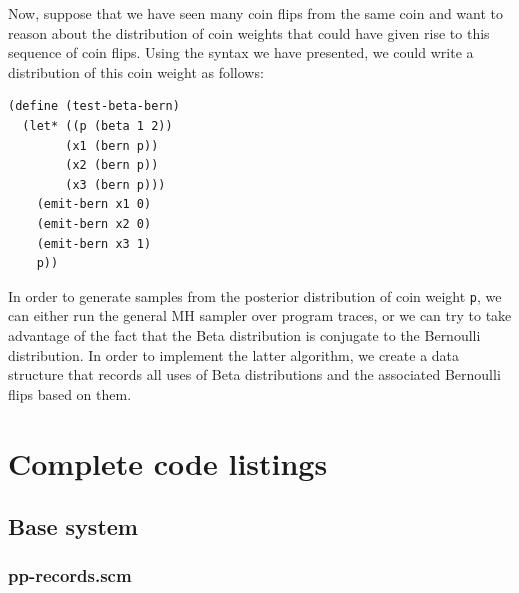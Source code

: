 \documentclass{article}
\begin{document}
Now, suppose that we have seen many coin flips from the same coin and want to
reason about the distribution of coin weights that could have given rise to
this sequence of coin flips. Using the syntax we have presented, we could write
a distribution of this coin weight as follows:
\begin{verbatim}
(define (test-beta-bern)
  (let* ((p (beta 1 2))
        (x1 (bern p))
        (x2 (bern p))
        (x3 (bern p)))
    (emit-bern x1 0)
    (emit-bern x2 0)
    (emit-bern x3 1)
    p))
\end{verbatim}

In order to generate samples from the posterior distribution of coin weight
\verb+p+, we can either run the general MH sampler over program traces, or we
can try to take advantage of the fact that the Beta distribution is conjugate
to the Bernoulli distribution. In order to implement the latter algorithm, we
create a data structure that records all uses of Beta distributions and the
associated Bernoulli flips based on them.  

\section{Complete code listings}
\label{sec:listings}

\subsection{Base system}

\subsubsection{pp-records.scm}
\end{document}
